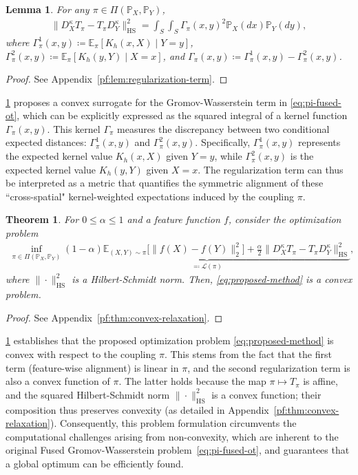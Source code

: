 \documentclass{article}
\newtheorem{theorem}{Theorem}
\newtheorem{lemma}{Lemma}
\begin{document}
\begin{lemma}
	\label{lem:regularization-term}
	For any $\pi \in \Pi(\mathbb{P}_X,\mathbb{P}_Y)$,
	\begin{align*}
		\| D_X^{\kappa}T_{\pi} - T_{\pi}D_Y^{\kappa} \|_{\mathrm{HS}}^2 = \int_S\int_S \Gamma_\pi(x,y)^2\mathbb{P}_X(dx)\mathbb{P}_Y(dy) ,
	\end{align*}
	where $\Gamma_\pi^1(x,y) \coloneqq \mathbb{E}_\pi[K_h(x,X) \mid Y = y]$, $\Gamma_\pi^2(x,y) \coloneqq \mathbb{E}_\pi[K_h(y,Y) \mid X = x]$, and $\Gamma_\pi(x,y) \coloneqq \Gamma_\pi^1(x,y) - \Gamma_\pi^2(x,y)$.
\end{lemma}
\begin{proof}
	See Appendix~\ref{pf:lem:regularization-term}.
\end{proof}
\cref{lem:regularization-term} proposes a convex surrogate for the Gromov-Wasserstein term in \eqref{eq:pi-fused-ot}, which can be explicitly expressed as the squared integral of a kernel function $\Gamma_\pi(x,y)$. This kernel $\Gamma_\pi$ measures the discrepancy between two conditional expected distances: $\Gamma_\pi^1(x,y)$ and $\Gamma_\pi^2(x,y)$. Specifically, $\Gamma_\pi^1(x,y)$ represents the expected kernel value $K_h(x,X)$ given $Y=y$, while $\Gamma_\pi^2(x,y)$ is the expected kernel value $K_h(y,Y)$ given $X=x$. The regularization term can thus be interpreted as a metric that quantifies the symmetric alignment of these ``cross-spatial" kernel-weighted expectations induced by the coupling $\pi$.

\begin{theorem}
	\label{thm:convex-relaxation}
	For $0 \leq \alpha \leq 1$ and a feature function $f$, consider the optimization problem 
	\begin{align}
		\label{eq:proposed-method}
		\inf_{\pi\in\Pi(\mathbb{P}_X,\mathbb{P}_Y)} \underbrace{(1-\alpha)\mathbb{E}_{(X,Y)\sim\pi}\big[\|f(X)-f(Y)\|_2^2\big] + \frac{\alpha}{2} \| D_X^{\kappa}T_\pi - T_\pi D_Y^{\kappa} \|_{\mathrm{HS}}^2}_{ \eqqcolon \mathcal{L}(\pi)} ,
	\end{align}
	where $\|\cdot\|_{\mathrm{HS}}^2$ is a Hilbert-Schmidt norm. Then, \eqref{eq:proposed-method} is a convex problem.
\end{theorem}
\begin{proof}
	See Appendix~\ref{pf:thm:convex-relaxation}.
\end{proof}
\cref{thm:convex-relaxation} establishes that the proposed optimization problem \eqref{eq:proposed-method} is convex with respect to the coupling $\pi$. This stems from the fact that the first term (feature-wise alignment) is linear in $\pi$, and the second regularization term is also a convex function of $\pi$. The latter holds because the map $\pi \mapsto T_\pi$ is affine, and the squared Hilbert-Schmidt norm $\|\cdot\|_{\mathrm{HS}}^2$ is a convex function; their composition thus preserves convexity (as detailed in Appendix~\ref{pf:thm:convex-relaxation}). Consequently, this problem formulation circumvents the computational challenges arising from non-convexity, which are inherent to the original Fused Gromov-Wasserstein problem~\eqref{eq:pi-fused-ot}, and guarantees that a global optimum can be efficiently found.
\end{document}
